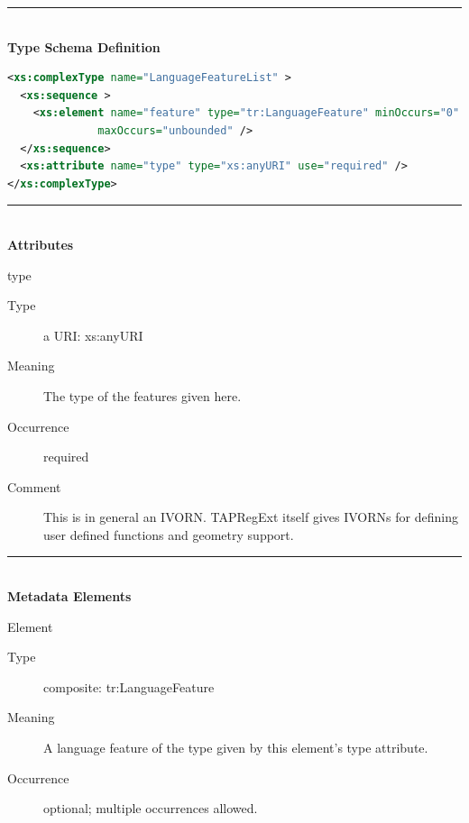 \documentclass{ivoa}
\begin{document}
\noindent\rule[-2pt]{\textwidth}{0.5pt}\\
			\textbf{ Type Schema Definition}

\begin{lstlisting}[language=XML]
<xs:complexType name="LanguageFeatureList" >
  <xs:sequence >
    <xs:element name="feature" type="tr:LanguageFeature" minOccurs="0"
              maxOccurs="unbounded" />
  </xs:sequence>
  <xs:attribute name="type" type="xs:anyURI" use="required" />
</xs:complexType>
\end{lstlisting}

\noindent\rule[-2pt]{\textwidth}{0.5pt}\\
					\textbf{ Attributes}

\begin{bigdescription}
\item[type]
\begin{description}
\item[Type\quad] a URI: xs:anyURI
\item[Meaning\quad] 
					The type of the features given here.
				
\item[Occurrence\quad] required
\item[Comment\quad] 
					This is in general an IVORN.  TAPRegExt itself gives
					IVORNs for defining user defined functions and geometry
					support.
				
\end{description}


\end{bigdescription}



\noindent\rule[-2pt]{\textwidth}{0.5pt}\\
					\textbf{ Metadata Elements}

\begin{bigdescription}\item[Element \xmlel{feature}]
\begin{description}
\item[Type\quad] composite: tr:LanguageFeature
\item[Meaning\quad] 
						A language feature of the type given by this
						element's type attribute.
					
\item[Occurrence\quad] optional; multiple occurrences allowed.

\end{description}


\end{bigdescription}
\end{document}
